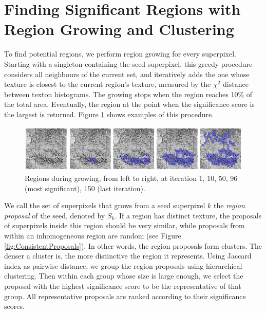 \documentclass{llncs}
\begin{document}
\section{Finding Significant Regions with Region Growing and Clustering}

To find potential regions, we perform region growing for every superpixel. Starting with a singleton containing the seed superpixel, this greedy procedure considers all neighbours of the current set, and iteratively adds the one whose texture is closest to the current region's texture, measured by the $\chi^2$ distance between texton histograms. The growing stops when the region reaches 10\% of the total area. Eventually, the region at the point when the significance score is the largest is returned. Figure \ref{fig:RegionGrowing} shows examples of this procedure.
\begin{figure}
\centering
	\includegraphics[width=.8\textwidth]{../figures/RegionGrowingPicsOnly.png}
	\caption{Regions during growing, from left to right, at iteration 1, 10, 50, 96 (most significant), 150 (last iteration).} %
	\label{fig:RegionGrowing}
\end{figure}


We call the set of superpixels that grows from a seed superpixel $k$ the \textit{region proposal} of the seed, denoted by $S_k$. If a region has distinct texture, the proposals of superpixels inside this region should be very similar, while proposals from within an inhomogeneous region are random (see Figure \ref{fig:ConsistentProposals}). In other words, the region proposals form clusters. The denser a cluster is, the more distinctive the region it represents. Using Jaccard index as pairwise distance, we group the region proposals using hierarchical clustering. Then within each group whose size is large enough, we select the proposal with the highest significance score to be the representative of that group. All representative proposals are ranked according to their significance scores. 
\end{document}
